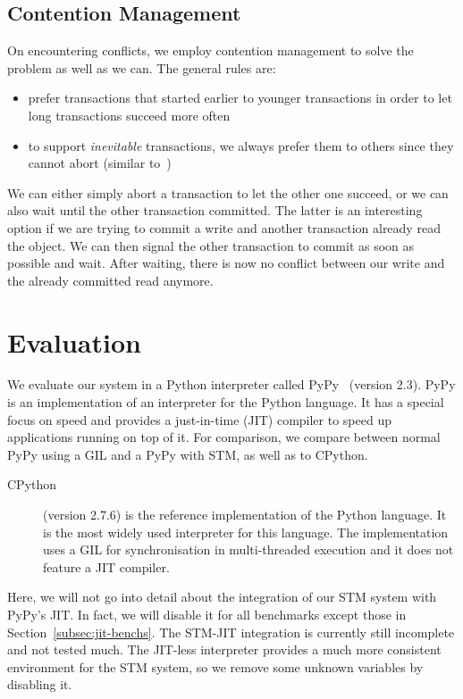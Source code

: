 \documentclass{sigplanconf}
\begin{document}
\subsection{Contention Management\label{subsub:contentionmanagement}}

On encountering conflicts, we employ contention management to solve
the problem as well as we can. The general rules are:
\begin{itemize}[noitemsep]
\item prefer transactions that started earlier to younger transactions
  in order to let long transactions succeed more often
\item to support \emph{inevitable} transactions, we always prefer them
  to others since they cannot abort (similar to~\cite{blundell06})
\end{itemize}
We can either simply abort a transaction to let the other one succeed,
or we can also wait until the other transaction committed. The latter
is an interesting option if we are trying to commit a write and
another transaction already read the object. We can then signal the
other transaction to commit as soon as possible and wait. After
waiting, there is now no conflict between our write and the already
committed read anymore.



\section{Evaluation}

We evaluate our system in a Python interpreter called
PyPy~\cite{pypy} (version 2.3). PyPy is an implementation of an
interpreter for the Python language. It has a special focus on speed
and provides a just-in-time (JIT) compiler to speed up applications
running on top of it. For comparison, we compare between normal PyPy
using a GIL and a PyPy with STM, as well as to CPython.
\begin{description}
\item[CPython] (version 2.7.6) is the reference implementation of the Python
  language. It is the most widely used interpreter for this language.
  The implementation uses a GIL for synchronisation in multi-threaded
  execution and it does not feature a JIT compiler.
\end{description}

Here, we will not go into detail about the integration of our STM
system with PyPy's JIT. In fact, we will disable it for all benchmarks
except those in Section~\ref{subsec:jit-benchs}. The STM-JIT
integration is currently still incomplete and not tested much. The
JIT-less interpreter provides a much more consistent environment for
the STM system, so we remove some unknown variables by disabling it.
\end{document}

